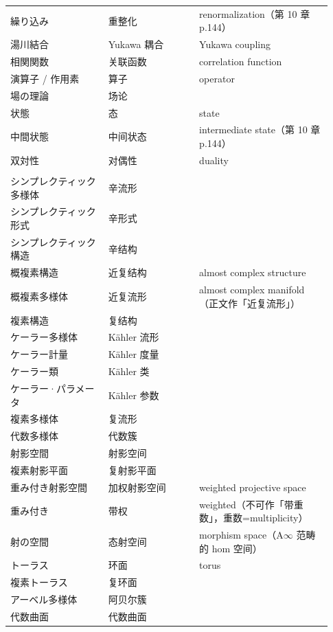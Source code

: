 \begin{longtable}{@{}>{\raggedright\arraybackslash}p{0.29\linewidth}>{\raggedright\arraybackslash}p{0.26\linewidth}>{\raggedright\arraybackslash}p{0.38\linewidth}@{}}
繰り込み & \mbox{重整化} & renormalization（第 10 章 p.144） \\
湯川結合 & Yukawa \mbox{耦合} & Yukawa coupling \\
相関関数 & \mbox{关联函数} & correlation function \\
演算子 / 作用素 & \mbox{算子} & operator \\
場の理論 & \mbox{场论} &  \\
状態 & \mbox{态} & state \\
中間状態 & \mbox{中间状态} & intermediate state（第 10 章 p.144） \\
双対性 & \mbox{对偶性} & duality \\
\multicolumn{3}{@{}l}{\textbf{三、流形、复几何与代数几何}}\\
\midrule
シンプレクティック多様体 & \mbox{辛流形} &  \\
シンプレクティック形式 & \mbox{辛形式} &  \\
シンプレクティック構造 & \mbox{辛结构} &  \\
概複素構造 & \mbox{近复结构} & almost complex structure \\
概複素多様体 & \mbox{近复流形} & almost complex manifold（正文作「近复流形」） \\
複素構造 & \mbox{复结构} &  \\
ケーラー多様体 & Kähler \mbox{流形} &  \\
ケーラー計量 & Kähler \mbox{度量} &  \\
ケーラー類 & Kähler \mbox{类} &  \\
ケーラー·パラメータ & Kähler \mbox{参数} &  \\
複素多様体 & \mbox{复流形} &  \\
代数多様体 & \mbox{代数簇} &  \\
射影空間 & \mbox{射影空间} &  \\
複素射影平面 & \mbox{复射影平面} &  \\
重み付き射影空間 & \mbox{加权射影空间} & weighted projective space \\
重み付き & \mbox{带权} & weighted（不可作「带重数」，重数=multiplicity） \\
射の空間 & \mbox{态射空间} & morphism space（A$\infty$ 范畴的 hom 空间） \\
トーラス & \mbox{环面} & torus \\
複素トーラス & \mbox{复环面} &  \\
アーベル多様体 & \mbox{阿贝尔簇} &  \\
代数曲面 & \mbox{代数曲面} &  \\

\end{longtable}
